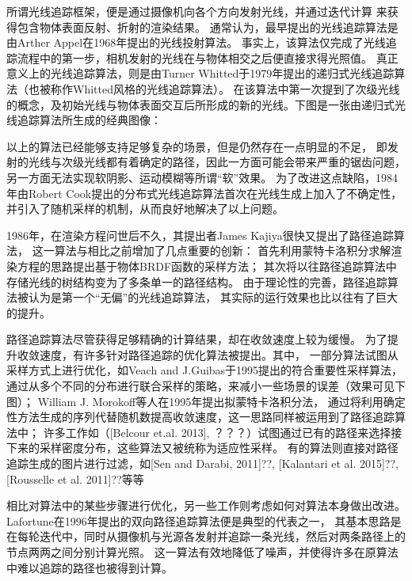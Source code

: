所谓光线追踪框架，便是通过摄像机向各个方向发射光线，并通过迭代计算
来获得包含物体表面反射、折射的渲染结果。
通常认为，最早提出的光线追踪算法是由Arther Appel在1968年提出的光线投射算法\cite{RayCasting}。
事实上，该算法仅完成了光线追踪流程中的第一步，相机发射的光线在与物体相交之后便直接求得光照值。
真正意义上的光线追踪算法，则是由Turner Whitted于1979年提出的递归式光线追踪算法\cite{WhittedRayTracing}（也被称作Whitted风格的光线追踪算法）。
在该算法中第一次提到了次级光线的概念，及初始光线与物体表面交互后所形成的新的光线。下图是一张由递归式光线追踪算法所生成的经典图像：

以上的算法已经能够支持足够复杂的场景，但是仍然存在一点明显的不足，
即发射的光线与次级光线都有着确定的路径，因此一方面可能会带来严重的锯齿问题，
另一方面无法实现软阴影、运动模糊等所谓“软”效果。
为了改进这点缺陷，1984年由Robert Cook提出的分布式光线追踪算法\cite{DistributiveRayTracing}首次在光线生成上加入了不确定性，
并引入了随机采样的机制，从而良好地解决了以上问题。

1986年，在渲染方程问世后不久，其提出者James Kajiya很快又提出了路径追踪算法\cite{PathTracing}，
这一算法与相比之前增加了几点重要的创新：
首先利用蒙特卡洛积分求解渲染方程的思路提出基于物体BRDF函数的采样方法；
其次将以往路径追踪算法中存储光线的树结构变为了多条单一的路径结构。
由于理论性的完善，路径追踪算法被认为是第一个“无偏”的光线追踪算法，
其实际的运行效果也比以往有了巨大的提升。

路径追踪算法尽管获得足够精确的计算结果，却在收敛速度上较为缓慢。
为了提升收敛速度，有许多针对路径追踪的优化算法被提出。其中，
一部分算法试图从采样方式上进行优化，如Veach and J.Guibas于1995提出的符合重要性采样\cite{MultipleImportanceSampling}算法，
通过从多个不同的分布进行联合采样的策略，来减小一些场景的误差（效果可见下图）；
William J. Morokoff等人在1995年提出拟蒙特卡洛积分法\cite{QuasiMonteCarlo}，
通过将利用确定性方法生成的序列代替随机数提高收敛速度，这一思路同样被运用到了路径追踪算法中；
许多工作如（[Belcour et.al. 2013], ？？？）试图通过已有的路径来选择接下来的采样密度分布，这些算法又被统称为适应性采样。
有的算法则直接对路径追踪生成的图片进行过滤，如[Sen and Darabi, 2011]??, [Kalantari et al. 2015]??, [Rousselle et al. 2011]??等等

相比对算法中的某些步骤进行优化，另一些工作则考虑如何对算法本身做出改进。
Lafortune在1996年提出的双向路径追踪算法\cite{BidirectionalPathTracing}便是典型的代表之一，
其基本思路是在每轮迭代中，同时从摄像机与光源各发射并追踪一条光线，然后对两条路径上的节点两两之间分别计算光照。
这一算法有效地降低了噪声，并使得许多在原算法中难以追踪的路径也被得到计算。

